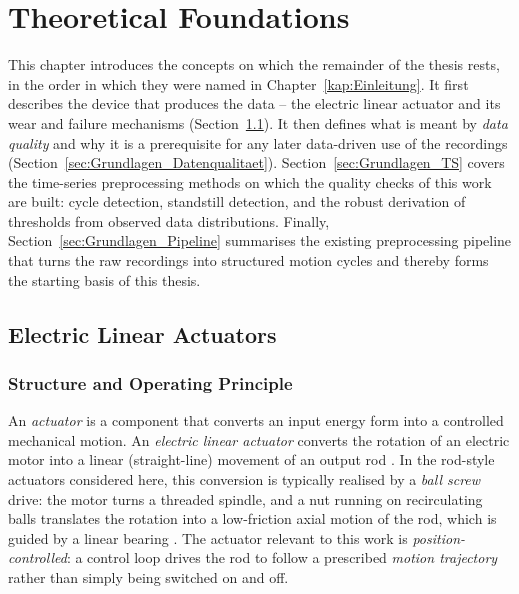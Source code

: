 \chapter{Theoretical Foundations}
\label{kap:Theoretische_Grundlagen}


This chapter introduces the concepts on which the remainder of the thesis rests, in the
order in which they were named in Chapter~\ref{kap:Einleitung}. It first describes the
device that produces the data -- the electric linear actuator and its wear and failure
mechanisms (Section~\ref{sec:Grundlagen_Aktuator}). It then defines what is meant by
\emph{data quality} and why it is a prerequisite for any later data-driven use of the
recordings (Section~\ref{sec:Grundlagen_Datenqualitaet}). Section~\ref{sec:Grundlagen_TS}
covers the time-series preprocessing methods on which the quality checks of this work are
built: cycle detection, standstill detection, and the robust derivation of thresholds from
observed data distributions. Finally, Section~\ref{sec:Grundlagen_Pipeline} summarises the
existing preprocessing pipeline that turns the raw recordings into structured motion
cycles and thereby forms the starting basis of this thesis.

\section{Electric Linear Actuators}
\label{sec:Grundlagen_Aktuator}

\subsection{Structure and Operating Principle}
\label{subsec:Grundlagen_Aufbau}

An \emph{actuator} is a component that converts an input energy form into a controlled
mechanical motion. An \emph{electric linear actuator} converts the rotation of an electric
motor into a linear (straight-line) movement of an output rod \parencite{TODO-actuator-fundamentals}.
In the rod-style actuators considered here, this conversion is typically realised by a
\emph{ball screw} drive: the motor turns a threaded spindle, and a nut running on
recirculating balls translates the rotation into a low-friction axial motion of the rod,
which is guided by a linear bearing \parencite{ma_wear_2024}. The actuator relevant to
this work is \emph{position-controlled}: a control loop drives the rod to follow a
prescribed \emph{motion trajectory} rather than simply being switched on and off.

